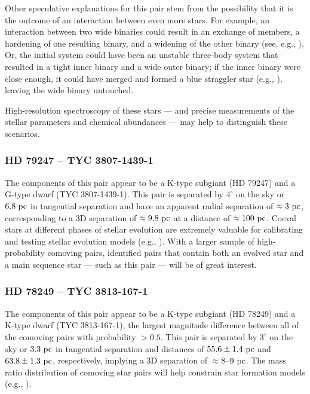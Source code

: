 \documentclass[modern, letterpaper]{aastex61}
\begin{document}
Other speculative explanations for this pair stem from the possibility that it
is the outcome of an interaction between even more stars.
For example, an interaction between two wide binaries could result in an
exchange of members, a hardening of one resulting binary, and a widening of the
other binary (see, e.g., \citealt{Leigh:2016}).
Or, the initial system could have been an unstable three-body system that
resulted in a tight inner binary and a wide outer binary;
if the inner binary were close enough, it could have merged and formed a blue
straggler star (e.g., \citealt{Naoz:2014}), leaving the wide binary untouched.

High-resolution spectroscopy of these stars --- and precise measurements of the
stellar parameters and chemical abundances --- may help to distinguish these
scenarios.

\subsubsection{HD 79247 -- TYC 3807-1439-1}

The components of this pair appear to be a K-type subgiant (HD 79247) and a
G-type dwarf (TYC 3807-1439-1).
This pair is separated by $4^\circ$ on the sky or $6.8~\mathrm{pc}$ in tangential
separation and have an apparent radial separation of $\approx 3~\mathrm{pc}$,
corresponding to a 3D separation of $\approx 9.8~\mathrm{pc}$ at a distance of $\approx
100~\mathrm{pc}$.
Coeval stars at different phases of stellar evolution are extremely valuable for
calibrating and testing stellar evolution models (e.g., \citealt{Torres:2013}).
With a larger sample of high-probability comoving pairs, identified pairs that
contain both an evolved star and a main sequence star --- such as this pair ---
will be of great interest.

\subsubsection{HD 78249 -- TYC 3813-167-1}

The components of this pair appear to be a K-type subgiant (HD 78249) and a
K-type dwarf (TYC 3813-167-1), the largest magnitude difference between all of
the comoving pairs with probability $>0.5$.
This pair is separated by $3^\circ$ on the sky or $3.3~\mathrm{pc}$ in tangential
separation and distances of $55.6 \pm 1.4~\mathrm{pc}$ and $63.8 \pm 1.3~\mathrm{pc}$,
respectively, implying a 3D separation of $\approx8$--$9~\mathrm{pc}$.
The mass ratio distribution of comoving star pairs will help constrain star
formation models (e.g., \citealt{Raghavan:2010}).
\end{document}
